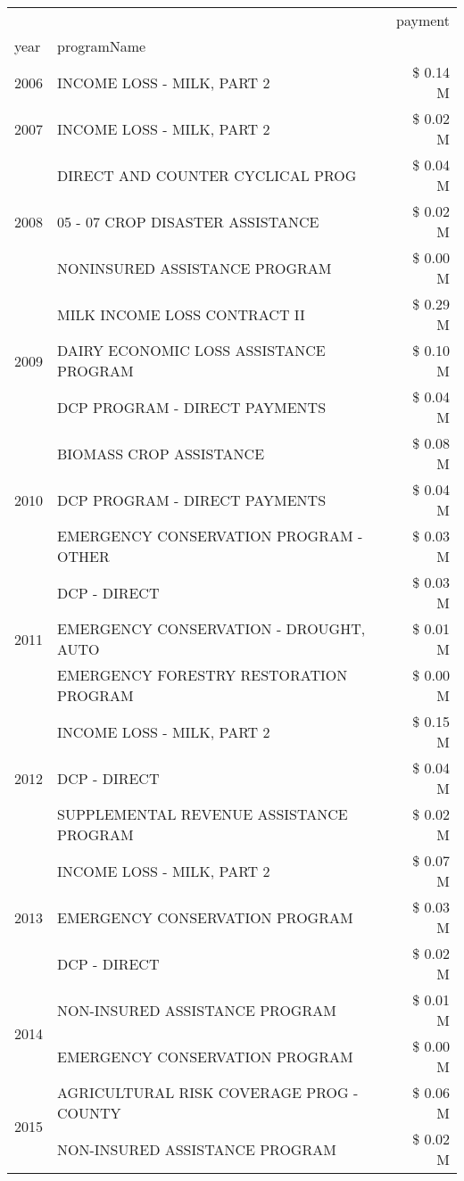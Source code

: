 \begin{tabular}{llr}
\toprule
 &  & payment \\
year & programName &  \\
\midrule
2006 & INCOME LOSS - MILK, PART 2 & \$ 0.14 M \\
\cline{1-3}
2007 & INCOME LOSS - MILK, PART 2 & \$ 0.02 M \\
\cline{1-3}
\multirow[t]{3}{*}{2008} & DIRECT AND COUNTER CYCLICAL PROG & \$ 0.04 M \\
 & 05 - 07 CROP DISASTER ASSISTANCE & \$ 0.02 M \\
 & NONINSURED ASSISTANCE PROGRAM & \$ 0.00 M \\
\cline{1-3}
\multirow[t]{3}{*}{2009} & MILK INCOME LOSS CONTRACT II & \$ 0.29 M \\
 & DAIRY ECONOMIC LOSS ASSISTANCE PROGRAM & \$ 0.10 M \\
 & DCP PROGRAM - DIRECT PAYMENTS & \$ 0.04 M \\
\cline{1-3}
\multirow[t]{3}{*}{2010} & BIOMASS CROP ASSISTANCE & \$ 0.08 M \\
 & DCP PROGRAM - DIRECT PAYMENTS & \$ 0.04 M \\
 & EMERGENCY CONSERVATION PROGRAM - OTHER & \$ 0.03 M \\
\cline{1-3}
\multirow[t]{3}{*}{2011} & DCP - DIRECT & \$ 0.03 M \\
 & EMERGENCY CONSERVATION - DROUGHT, AUTO & \$ 0.01 M \\
 & EMERGENCY FORESTRY RESTORATION PROGRAM & \$ 0.00 M \\
\cline{1-3}
\multirow[t]{3}{*}{2012} & INCOME LOSS - MILK, PART 2 & \$ 0.15 M \\
 & DCP - DIRECT & \$ 0.04 M \\
 & SUPPLEMENTAL REVENUE ASSISTANCE PROGRAM & \$ 0.02 M \\
\cline{1-3}
\multirow[t]{3}{*}{2013} & INCOME LOSS - MILK, PART 2 & \$ 0.07 M \\
 & EMERGENCY CONSERVATION PROGRAM & \$ 0.03 M \\
 & DCP - DIRECT & \$ 0.02 M \\
\cline{1-3}
\multirow[t]{2}{*}{2014} & NON-INSURED ASSISTANCE PROGRAM & \$ 0.01 M \\
 & EMERGENCY CONSERVATION PROGRAM & \$ 0.00 M \\
\cline{1-3}
\multirow[t]{3}{*}{2015} & AGRICULTURAL RISK COVERAGE PROG - COUNTY & \$ 0.06 M \\
 & NON-INSURED ASSISTANCE PROGRAM & \$ 0.02 M \\

\end{tabular}
